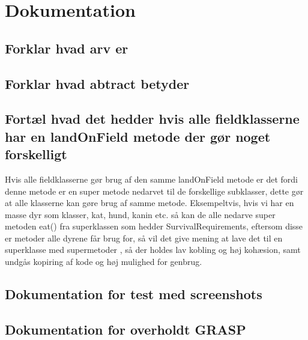 \section{Dokumentation}
\subsection{Forklar hvad arv er}

\subsection{Forklar hvad abtract betyder}

\subsection{Fortæl hvad det hedder hvis alle fieldklasserne har en landOnField metode der gør noget forskelligt}
Hvis alle fieldklasserne gør brug af den samme landOnField metode er det fordi denne metode er en super metode nedarvet til de forskellige subklasser,
dette gør at alle klasserne kan gøre brug af samme metode. Eksempeltvis, hvis vi har en masse dyr som klasser, kat, hund, kanin etc. så kan de alle nedarve super metoden eat() fra 
superklassen som hedder SurvivalRequirements, eftersom disse er metoder alle dyrene får brug for, så vil det give mening at lave det til en superklasse med supermetoder
, så der holdes lav kobling og høj kohæsion, samt undgås kopiring af kode og høj mulighed for genbrug.
\subsection{Dokumentation for test med screenshots}

\subsection{Dokumentation for overholdt GRASP}
